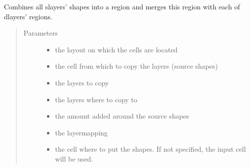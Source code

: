 \documentclass[a4paper,10pt,english]{sphinxmanual}
\begin{document}
\begin{fulllineitems}
\label{\detokenize{photonics/photonics:kppc.photonics.dataprep.add}}
Combines all slayers’ shapes into a region and merges this region with each of dlayers’ regions.
\begin{quote}\begin{description}
\item[{Parameters}] \leavevmode\begin{itemize}
\item {} 
 \textendash{} the layout on which the cells are located

\item {} 
 \textendash{} the cell from which to copy the layers (source shapes)

\item {} 
 \textendash{} the layers to copy

\item {} 
 \textendash{} the layers where to copy to

\item {} 
 \textendash{} the amount added around the source shapes

\item {} 
 \textendash{} the layermapping

\item {} 
 \textendash{} the cell where to put the shapes. If not specified, the input cell will be used.

\end{itemize}

\end{description}\end{quote}

\end{fulllineitems}

\end{document}

